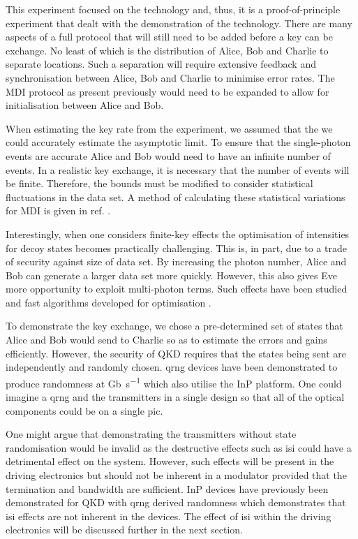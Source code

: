 This experiment focused on the technology and, thus, it is a proof-of-principle experiment that dealt with the demonstration of the technology. There are many aspects of a full protocol that will still need to be added before a key can be exchange. No least of which is the distribution of Alice, Bob and Charlie to separate locations. Such a separation will require extensive feedback and synchronisation between Alice, Bob and Charlie to minimise error rates. The \ac{MDI} protocol as present previously would need to be expanded to allow for initialisation between Alice and Bob. 

When estimating the key rate from the experiment, we assumed that the we could accurately estimate the asymptotic limit. To ensure that the single-photon events are accurate Alice and Bob would need to have an infinite number of events. In a realistic key exchange, it is necessary that the number of events will be finite. Therefore, the bounds must be modified to consider statistical fluctuations in the data set. A method of calculating these statistical variations for \ac{MDI} is given in ref. \cite{zhou2016}.

Interestingly, when one considers finite-key effects the optimisation of intensities for decoy states becomes practically challenging. This is, in part, due to a trade of security against size of data set. By increasing the photon number, Alice and Bob can generate a larger data set more quickly. However, this also gives Eve more opportunity to exploit multi-photon terms. Such effects have been studied and fast algorithms developed for optimisation \cite{Wang2019asymmetric}.

To demonstrate the key exchange, we chose a pre-determined set of states that Alice and Bob would send to Charlie so as to estimate the errors and gains efficiently. However, the security of \ac{QKD} requires that the states being sent are independently and randomly chosen. \Ac{qrng} devices have been demonstrated to produce randomness at \si{Gb\per\second} \cite{Raffaelli2018, Abellan2016, herrero2017quantum} which also utilise the \ac{InP} platform. One could imagine a \ac{qrng} and the transmitters in a single design so that all of the optical components could be on a single \ac{pic}.

One might argue that demonstrating the transmitters without state randomisation would be invalid as the destructive effects such as \ac{isi} could have a detrimental effect on the system. However, such effects will be present in the driving electronics but should not be inherent in a modulator provided that the termination and bandwidth are sufficient. \Ac{InP} devices have previously been demonstrated for \ac{QKD} with \ac{qrng} derived randomness which demonstrates that \ac{isi} effects are not inherent in the devices. The effect of \ac{isi} within the driving electronics will be discussed further in the next section.

